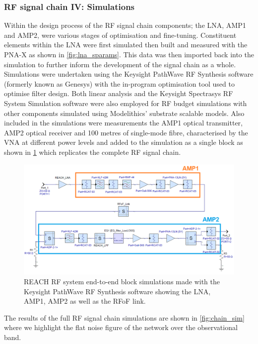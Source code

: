 \subsubsection{RF signal chain IV: Simulations}
Within the design process of the RF signal chain components; the LNA, AMP1 and AMP2, were various stages of optimisation and fine-tuning. Constituent elements within the LNA were first simulated then built and measured with the PNA-X as shown in \cref{fig:lna_sparams}. This data was then imported back into the simulation to further inform the development of the signal chain as a whole. Simulations were undertaken using the Keysight PathWave RF Synthesis software (formerly known as Genesys) with the in-program optimisation tool used to optimise filter design. Both linear analysis and the Keysight Spectrasys RF System Simulation software were also employed for RF budget simulations with other components simulated using Modelithics’ substrate scalable models. Also included in the simulations were measurements the AMP1 optical transmitter, AMP2 optical receiver and 100 metres of single-mode fibre, characterised by the VNA at different power levels and added to the simulation as a single block as shown in \cref{fig:chain_block_diag} which replicates the complete RF signal chain.
\begin{figure}
    \centering
    \includegraphics[width=\textwidth]{chain_block_diag}
    \caption{REACH RF system end-to-end block simulations made with the Keysight PathWave RF Synthesis software showing the LNA, AMP1, AMP2 as well as the RFoF link.}
    \label{fig:chain_block_diag}
\end{figure}
The results of the full RF signal chain simulations are shown in \cref{fig:chain_sim} where we highlight the flat noise figure of the network over the observational band.
